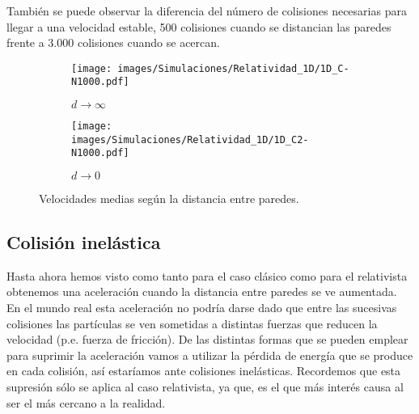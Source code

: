 \vspace{3mm}

 También se puede observar la diferencia del número de colisiones necesarias para llegar a una velocidad estable, 500 colisiones cuando se distancian las paredes frente a 3.000 colisiones cuando se acercan.

\begin{figure}[!h]
    \begin{subfigure}[b]{0.5\textwidth}
        \centering
        \texttt{[image: images/Simulaciones/Relatividad\_1D/1D\_C-N1000.pdf]}
        \caption{$d \rightarrow \infty$}
        \label{fig:relatividad_1D_C}
    \end{subfigure}
    \hfill
    \begin{subfigure}[b]{0.5\textwidth}
        \centering
        \texttt{[image: images/Simulaciones/Relatividad\_1D/1D\_C2-N1000.pdf]}
        \caption{$d \rightarrow 0$}
        \label{fig:relatividad_1D_C2}
    \end{subfigure}
    \caption{Velocidades medias según la distancia entre paredes.}
\end{figure}

\subsection{Colisión inelástica}

Hasta ahora hemos visto como tanto para el caso clásico como para el relativista obtenemos una aceleración cuando la distancia entre paredes se ve aumentada. En el mundo real esta aceleración no podría darse dado que entre las sucesivas colisiones las partículas se ven sometidas a distintas fuerzas que reducen la velocidad (p.e. fuerza de fricción). De las distintas formas que se pueden emplear para suprimir la aceleración vamos a utilizar la pérdida de energía que se produce en cada colisión, así estaríamos ante colisiones inelásticas. Recordemos que esta supresión sólo se aplica al caso relativista, ya que, es el que más interés causa al ser el más cercano a la realidad.




